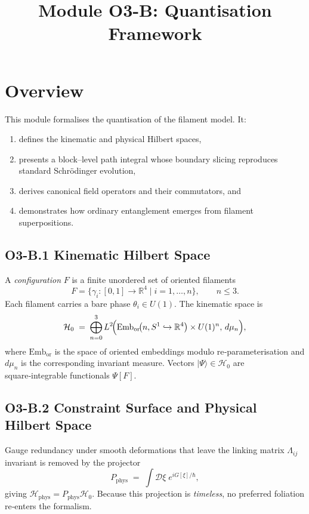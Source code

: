\documentclass[12pt]{article}
\title{Module O3-B: Quantisation Framework}
\author{}
\date{}
\begin{document}
\maketitle

\section*{Overview}
This module formalises the quantisation of the filament model.  It:
\begin{enumerate}
    \item defines the kinematic and physical Hilbert spaces,
    \item presents a block–level path integral whose boundary slicing reproduces standard Schrödinger evolution,
    \item derives canonical field operators and their commutators, and
    \item demonstrates how ordinary entanglement emerges from filament superpositions.
\end{enumerate}

\subsection*{O3-B.1 \quad Kinematic Hilbert Space}
A \emph{configuration} $F$ is a finite unordered set of oriented filaments
\[
  F=\{\gamma_i:[0,1]\!\to\!\mathbb R^{4}\mid i=1,\dots,n\}, \qquad n\le 3.
\]
Each filament carries a bare phase $\theta_i\in U(1)$.  The kinematic space is
\[
  \mathcal H_0 \;=\; \bigoplus_{n=0}^{3}
  L^{2}\!\Bigl(\mathrm{Emb}_{\mathrm{or}}\!\bigl(n,S^{1}\hookrightarrow\mathbb R^{4}\bigr)
  \times U(1)^{n},\, d\mu_n\Bigr),
\]
where $\mathrm{Emb}_{\mathrm{or}}$ is the space of oriented embeddings modulo re‑parameterisation and $d\mu_n$ is the corresponding invariant measure.  Vectors $\lvert\Psi\rangle\in\mathcal H_0$ are square‑integrable functionals $\Psi[F]$.

\subsection*{O3-B.2 \quad Constraint Surface and Physical Hilbert Space}
Gauge redundancy under smooth deformations that leave the linking matrix $\Lambda_{ij}$ invariant is removed by the projector
\[
  P_{\text{phys}} \;=\; \int\!\mathcal D\xi\; e^{i G[\xi]/\hbar},
\]
giving $\mathcal H_{\text{phys}} = P_{\text{phys}}\mathcal H_0$.  Because this projection is \emph{timeless}, no preferred foliation re‑enters the formalism.
\end{document}
